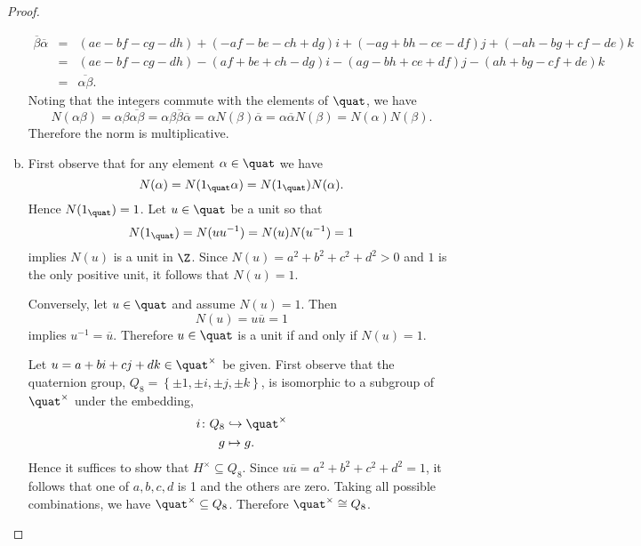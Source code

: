 \documentclass[10pt]{amsart}
\begin{document}
\begin{thm}
\begin{proof}
\begin{enumerate}[(a)]
\begin{eqnarray*}
          \overline{\beta}\overline{\alpha} &=& (ae - bf - cg - dh) + (-af -be -ch + dg)i + (-ag + bh - ce - df)j + (-ah -bg + cf -de)k\\
          &=& (ae - bf - cg - dh) -(af + be + ch - dg)i - (ag - bh + ce + df)j - (ah + bg - cf + de)k\\
          &=& \overline{\alpha\beta}.
        \end{eqnarray*}
        Noting that the integers commute with the elements of $\quat$, we have
        $$N(\alpha\beta) = \alpha \beta \overline{\alpha \beta} = \alpha \beta \overline{\beta} \overline{\alpha} = \alpha N(\beta) \overline{\alpha} = \alpha \overline{\alpha} N(\beta) = N(\alpha)N(\beta).$$
        Therefore the norm is multiplicative.
      \item
        First observe that for any element $\alpha \in \quat$ we have
        $$N(\alpha) = N(1_\quat \alpha) = N(1_\quat)N(\alpha).$$
        Hence $N(1_\quat) = 1$.
        Let $u \in \quat$ be a unit so that
        $$N(1_\quat) = N(uu^{-1}) = N(u)N(u^{-1}) = 1$$
        implies $N(u)$ is a unit in $\Z$.
        Since $N(u) = a^2 + b^2 + c^2 + d^2 > 0$ and $1$ is the only positive unit, it follows that $N(u) = 1$.
        
        Conversely, let $u \in \quat$ and assume $N(u) = 1$.
        Then $$N(u) = u\overline{u} = 1$$ implies $u^{-1} = \overline{u}$.
        Therefore $u \in \quat$ is a unit if and only if $N(u) = 1$.
        
        Let $u = a + bi + cj + dk \in \quat^\times$ be given.
        First observe that the quaternion group, $Q_8 = \left\{\pm 1, \pm i, \pm j, \pm k \right\}$, is isomorphic to a subgroup of $\quat^\times$ under the embedding,
        \begin{align*}
          i \colon Q_8 &\hookrightarrow \quat^\times\\
          g &\mapsto g.
        \end{align*}
        Hence it suffices to show that $H^\times \subseteq Q_8$.
        Since $u\overline{u} = a^2 + b^2 + c^2 + d^2 = 1$, it follows that one of $a, b, c, d$ is 1 and the others are zero.
        Taking all possible combinations, we have $\quat^\times \subseteq Q_8$.
        Therefore $\quat^\times \cong Q_8$.
    \end{enumerate}
  \end{proof}
\end{thm}
\end{document}
